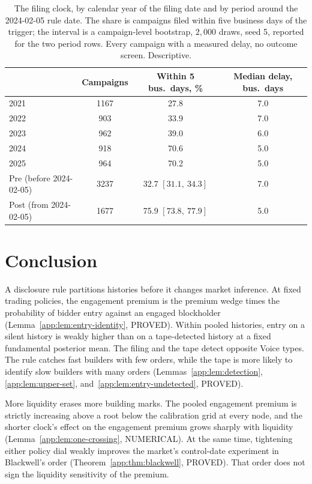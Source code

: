 \documentclass[11pt]{article}
\begin{document}
\begin{table}[H]
\centering
\caption{The filing clock, by calendar year of the filing date and by period around the
2024-02-05 rule date. The share is campaigns filed within five business days of the trigger;
the interval is a campaign-level bootstrap, $2{,}000$ draws, seed 5, reported for the two
period rows. Every campaign with a measured delay, no outcome screen. Descriptive.}
\label{tab:clock}
\begin{tabular}{lccc}
\toprule
 & Campaigns & Within 5 bus.\ days, \% & Median delay, bus.\ days \\
\midrule
2021 & 1167 & 27.8 & 7.0 \\
2022 & 903 & 33.9 & 7.0 \\
2023 & 962 & 39.0 & 6.0 \\
2024 & 918 & 70.6 & 5.0 \\
2025 & 964 & 70.2 & 5.0 \\
\midrule
Pre (before 2024-02-05)  & 3237 & 32.7 $[31.1,\ 34.3]$ & 7.0 \\
Post (from 2024-02-05)   & 1677 & 75.9 $[73.8,\ 77.9]$ & 5.0 \\
\bottomrule
\end{tabular}
\end{table}

\section{Conclusion}
\label{sec:conclusion}

A disclosure rule partitions histories before it changes market inference. At fixed trading
policies, the engagement premium is the premium wedge times the probability of bidder entry against
an engaged blockholder (Lemma~\ref{app:lem:entry-identity}, PROVED). Within pooled histories, entry
on a silent history is weakly higher than on a tape-detected history at a fixed fundamental
posterior mean. The filing and the tape detect opposite Voice types. The rule catches fast builders
with few orders, while the tape is more likely to identify slow builders with many orders
(Lemmas~\ref{app:lem:detection},
\ref{app:lem:upper-set}, and~\ref{app:lem:entry-undetected}, PROVED).

More liquidity erases more building marks. The pooled engagement premium is strictly increasing
above a root below the calibration grid at every node, and the shorter clock's effect on the
engagement premium grows sharply with liquidity (Lemma~\ref{app:lem:one-crossing}, NUMERICAL). At
the same time, tightening either policy dial weakly improves the market's control-date experiment
in Blackwell's order (Theorem~\ref{app:thm:blackwell}, PROVED). That order does not sign the
liquidity sensitivity of the premium.
\end{document}
